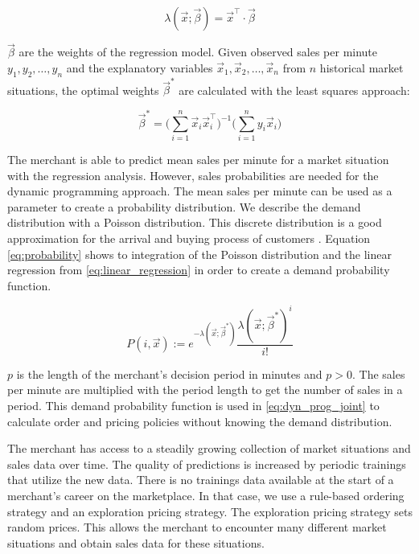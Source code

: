 \begin{equation}
\label{eq:linear_regression}
\lambda(\vec{x}; \vec{\beta}) = \vec{x}^\intercal \cdot \vec{\beta}
\end{equation}

$\vec{\beta}$ are the weights of the regression model.
Given observed sales per minute $y_1, y_2, \ldots, y_n$ and the explanatory variables $\vec{x}_1, \vec{x}_2, \ldots, \vec{x}_n$ from $n$ historical market situations, the optimal weights $\vec{\beta}^*$ are calculated with the least squares approach:

\begin{equation}
\vec{\beta}^* = \bigg(\sum_{i=1}^n{\vec{x}_i \vec{x}_i^\intercal} \bigg)^{-1}
			  \bigg(\sum_{i=1}^n{y_i \vec{x}_i} \bigg)
\end{equation}

The merchant is able to predict mean sales per minute for a market situation with the regression analysis.
However, sales probabilities are needed for the dynamic programming approach.
The mean sales per minute can be used as a parameter to create a probability distribution.
We describe the demand distribution with a Poisson distribution.
This discrete distribution is a good approximation for the arrival and buying process of customers \cite{DBLP:journals/ior/Wolff82}.
Equation \ref{eq:probability} shows to integration of the Poisson distribution and the linear regression from \cref{eq:linear_regression} in order to create a demand probability function.

\begin{equation}
\label{eq:probability}
P(i, \vec{x}) :=
	e^{-\lambda(\vec{x}; \vec{\beta}^*)}
	\frac{\lambda(\vec{x}; \vec{\beta}^*)^{i}}{i!}
\end{equation}

$p$ is the length of the merchant's decision period in minutes and $p > 0$.
The sales per minute are multiplied with the period length to get the number of sales in a period.
This demand probability function is used in \cref{eq:dyn_prog_joint} to calculate order and pricing policies without knowing the demand distribution.

The merchant has access to a steadily growing collection of market situations and sales data over time.
The quality of predictions is increased by periodic trainings that utilize the new data.
There is no trainings data available at the start of a merchant's career on the marketplace.
In that case, we use a rule-based ordering strategy and an exploration pricing strategy.
The exploration pricing strategy sets random prices.
This allows the merchant to encounter many different market situations and obtain sales data for these situations.

